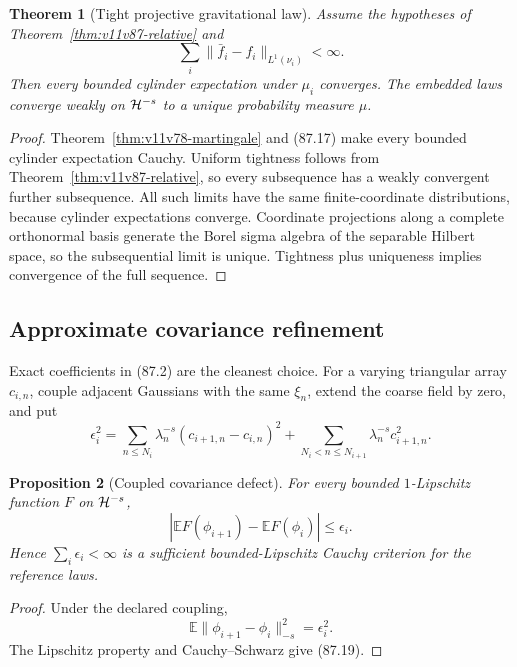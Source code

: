 \documentclass[11pt]{article}
\newtheorem{theorem}{Theorem}[section]
\newtheorem{proposition}[theorem]{Proposition}
\begin{document}
\begin{theorem}[Tight projective gravitational law]
\label{thm:v11v87-projective}
Assume the hypotheses of
Theorem~\ref{thm:v11v87-relative} and
\[
                         \sum_i\|\bar f_i-f_i\|_{L^1(\nu_i)}
                         <\infty.                            \tag{87.17}
\]
Then every bounded cylinder expectation under \(\mu_i\) converges.
The embedded laws converge weakly on \({\cal H}^{-s}\) to a unique
probability measure \(\mu\).
\end{theorem}

\begin{proof}
Theorem~\ref{thm:v11v78-martingale} and (87.17) make every bounded
cylinder expectation Cauchy.  Uniform tightness follows from
Theorem~\ref{thm:v11v87-relative}, so every subsequence has a weakly
convergent further subsequence.  All such limits have the same
finite-coordinate distributions, because cylinder expectations
converge.  Coordinate projections along a complete orthonormal basis
generate the Borel sigma algebra of the separable Hilbert space, so
the subsequential limit is unique.  Tightness plus uniqueness implies
convergence of the full sequence.
\end{proof}

\subsection{Approximate covariance refinement}

Exact coefficients in (87.2) are the cleanest choice.  For a varying
triangular array \(c_{i,n}\), couple adjacent Gaussians with the same
\(\xi_n\), extend the coarse field by zero, and put
\[
 \epsilon_i^2
 =\sum_{n\le N_i}\lambda_n^{-s}
          (c_{i+1,n}-c_{i,n})^2
  +\sum_{N_i<n\le N_{i+1}}\lambda_n^{-s}c_{i+1,n}^2.         \tag{87.18}
\]

\begin{proposition}[Coupled covariance defect]
\label{prop:v11v87-covariance}
For every bounded \(1\)-Lipschitz function \(F\) on
\({\cal H}^{-s}\),
\[
                 |\mathbb E F(\phi_{i+1})
                   -\mathbb E F(\phi_i)|
                 \le\epsilon_i.                             \tag{87.19}
\]
Hence \(\sum_i\epsilon_i<\infty\) is a sufficient bounded-Lipschitz
Cauchy criterion for the reference laws.
\end{proposition}

\begin{proof}
Under the declared coupling,
\[
 \mathbb E\|\phi_{i+1}-\phi_i\|_{-s}^2=\epsilon_i^2.
\]
The Lipschitz property and Cauchy--Schwarz give (87.19).
\end{proof}
\end{document}
